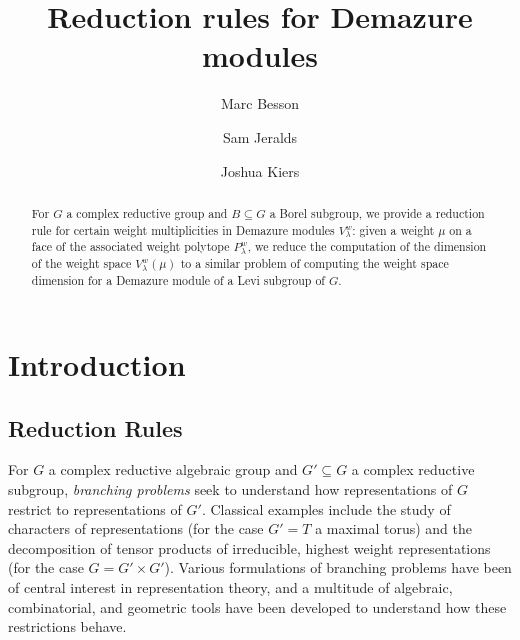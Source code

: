 \documentclass[12pt,reqno]{amsart}
\title{Reduction rules for Demazure modules}
\author{Marc Besson}
\author{Sam Jeralds}
\author{Joshua Kiers}
\theoremstyle{definition}
\begin{document}
\begin{abstract}
For $G$ a complex reductive group and $B  \subseteq G$ a Borel subgroup, we provide a reduction rule for certain weight multiplicities in Demazure modules $V_\lambda^w$: given a weight $\mu$ on a face of the associated weight polytope $P_\lambda^w$, we reduce the computation of the dimension of the weight space $V_\lambda^w(\mu)$ to a similar problem of computing the weight space dimension for a Demazure module of a Levi subgroup of $G$. 
\end{abstract}
\maketitle


\section{Introduction}



\subsection{Reduction Rules}
For $G$ a complex reductive algebraic group and $G'\subseteq G$ a complex reductive subgroup, \textit{branching problems} seek to understand how representations of $G$ restrict to representations of $G'$. Classical examples include the study of characters of representations (for the case $G'=T$ a maximal torus) and the decomposition of tensor products of irreducible, highest weight representations (for the case $G=G' \times G'$). Various formulations of branching problems have been of central interest in representation theory, and a multitude of algebraic, combinatorial, and geometric tools have been developed to understand how these restrictions behave. 
\end{document}
